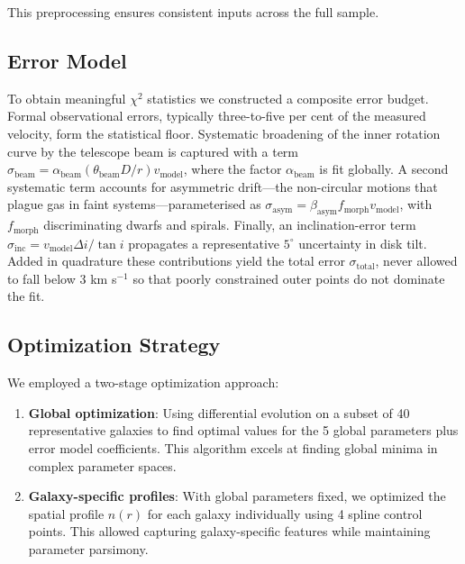 \documentclass[twocolumn,prd,amsmath,amssymb,aps,superscriptaddress,nofootinbib]{revtex4-2}
\newcommand{\chisq}{\chi^2}
\begin{document}
This preprocessing ensures consistent inputs across the full sample.

\subsection{Error Model}

To obtain meaningful $\chisq$ statistics we constructed a composite error budget.  Formal observational errors, typically three-to-five per cent of the measured velocity, form the statistical floor.  Systematic broadening of the inner rotation curve by the telescope beam is captured with a term $\sigma_{\mathrm{beam}} = \alpha_{\mathrm{beam}} (\theta_{\mathrm{beam}} D/r) v_{\mathrm{model}}$, where the factor $\alpha_{\mathrm{beam}}$ is fit globally.  A second systematic term accounts for asymmetric drift—the non-circular motions that plague gas in faint systems—parameterised as $\sigma_{\mathrm{asym}} = \beta_{\mathrm{asym}} f_{\mathrm{morph}} v_{\mathrm{model}}$, with $f_{\mathrm{morph}}$ discriminating dwarfs and spirals.  Finally, an inclination-error term $\sigma_{\mathrm{inc}} = v_{\mathrm{model}} \Delta i/\tan i$ propagates a representative $5^{\circ}$ uncertainty in disk tilt.  Added in quadrature these contributions yield the total error $\sigma_{\mathrm{total}}$, never allowed to fall below 3 km s$^{-1}$ so that poorly constrained outer points do not dominate the fit.

\subsection{Optimization Strategy}

We employed a two-stage optimization approach:

\begin{enumerate}
\item \textbf{Global optimization}: Using differential evolution \cite{Storn1997} on a subset of 40 representative galaxies to find optimal values for the 5 global parameters plus error model coefficients. This algorithm excels at finding global minima in complex parameter spaces.

\item \textbf{Galaxy-specific profiles}: With global parameters fixed, we optimized the spatial profile $n(r)$ for each galaxy individually using 4 spline control points. This allowed capturing galaxy-specific features while maintaining parameter parsimony.
\end{enumerate}
\end{document}
